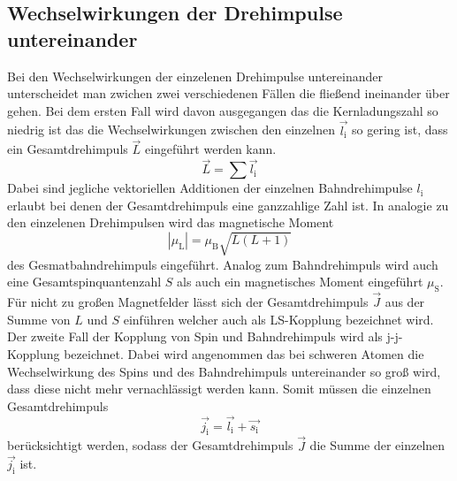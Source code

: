 \subsection{Wechselwirkungen der Drehimpulse untereinander}
Bei den Wechselwirkungen der einzelenen Drehimpulse untereinander unterscheidet man zwichen zwei verschiedenen Fällen die fließend ineinander über gehen.  Bei dem ersten Fall wird davon ausgegangen das die Kernladungszahl so niedrig ist das die Wechselwirkungen zwischen den einzelnen $\vec{l_\text{i}}$ so gering ist, dass ein Gesamtdrehimpuls $\vec{L}$ eingeführt werden kann.
\begin{equation}
  \vec{L} = \sum \vec{l_\text{i}}
  \label{eqn:L}
\end{equation}
Dabei sind jegliche vektoriellen Additionen der einzelnen Bahndrehimpulse $l_\text{i}$ erlaubt bei denen der Gesamtdrehimpuls eine ganzzahlige Zahl ist. In analogie zu den einzelenen Drehimpulsen wird das magnetische Moment
\begin{equation}
  |\mu_\text{L}| = \mu_\text{B} \sqrt{L(L+1)}
  \label{magL}
\end{equation}
des Gesmatbahndrehimpuls eingeführt. Analog zum Bahndrehimpuls wird auch eine Gesamtspinquantenzahl $S$ als auch ein magnetisches Moment eingeführt $\mu_\text{S}$. Für nicht zu großen Magnetfelder lässt sich der Gesamtdrehimpuls $\vec{J}$ aus der Summe von $L$ und $S$ einführen welcher auch als LS-Kopplung bezeichnet wird.
Der zweite Fall der Kopplung von Spin und Bahndrehimpuls wird als j-j-Kopplung bezeichnet. Dabei wird angenommen das bei schweren Atomen die Wechselwirkung des Spins und des Bahndrehimpuls untereinander so groß wird, dass diese nicht mehr vernachlässigt werden kann. Somit müssen die einzelnen Gesamtdrehimpuls
\begin{equation}
  \vec{j_\text{i}} = \vec{l_\text{i}} + \vec{s_\text{i}}
  \label{eqn:j}
\end{equation}
berücksichtigt werden, sodass der Gesamtdrehimpuls $\vec{J}$ die Summe der einzelnen $\vec{j_\text{i}}$ ist.

